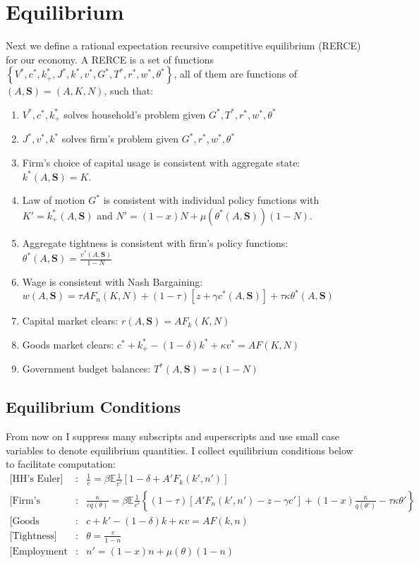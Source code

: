 \documentclass[12pt]{article}
\begin{document}
\section{Equilibrium}
Next we define a rational expectation recursive competitive equilibrium (RERCE) for our economy. A RERCE is a set of functions $\left\{ V^{*}, c^{*}, k_{+}^{*}, J^{*}, k^{*}, v^{*}, G^{*},T^{*},r^{*},w^{*},\theta^{*} \right\} $, all of them are functions of $(A,\mathbf{S})=(A,K,N)$, such that:
\begin{enumerate}
	\item $V^{*},c^{*},k_{+}^{*}$ solves household's problem given $G^{*},T^{*},r^{*},w^{*},\theta^{*}$
	\item $J^{*},v^{*},k^{*}$ solves firm's problem given $G^{*},r^{*},w^{*},\theta^{*}$
	\item Firm's choice of capital usage is consistent with aggregate state: $k^{*}(A,\mathbf{S})=K$.
	\item Law of motion $G^{*}$ is consistent with individual policy functions with $K'=k_{+}^{*}(A,\mathbf{S})$ and $N'=(1-x)N+\mu(\theta^{*}(A,\mathbf{S}))(1-N)$.
	\item Aggregate tightness is consistent with firm's policy functions: $\theta^{*}(A,\mathbf{S})=\frac{v^{*}(A,\mathbf{S})}{1-N}$
	\item Wage is consistent with Nash Bargaining: $w(A,\mathbf{S}) = \tau A F_{n}(K,N) + (1-\tau)\left[ z+\gamma c^{*}(A,\mathbf{S}) \right] + \tau \kappa \theta^{*}(A,\mathbf{S})$
	\item Capital market clears: $r(A,\mathbf{S})=AF_{k}(K,N)$
	\item Goods market clears: $c^{*}+k_{+}^{*}-(1-\delta)k^{*}+\kappa v^{*} = A F(K,N)$
	\item Government budget balances: $T^{*}(A,\mathbf{S})=z (1-N)$
\end{enumerate}

\subsection{Equilibrium Conditions}
From now on I suppress many subscripts and superscripts and use small case variables to denote equilibrium quantities. I collect equilibrium conditions below to facilitate computation:
\begin{eqnarray}
	\text{[HH's Euler]} & :& \frac{1}{c} =\beta \mathbb{E} \frac{1}{c'} \left[  1-\delta + A'F_{k}(k',n') \right] \label{eqn:HHEuler} \\
	\text{[Firm's Euler]} & :& \frac{\kappa}{c q(\theta)} = \beta \mathbb{E} \frac{1}{c'} \left\{  (1-\tau) \left[ A'F_{n}(k',n')-z-\gamma c' \right]+(1-x)\frac{\kappa}{q(\theta')} -\tau \kappa \theta' \right\} \label{eqn:firmEuler} \\
	\text{[Goods Market]} & :& c+k'-(1-\delta)k + \kappa v = AF(k,n) \label{eqn:resource} \\
	\text{[Tightness]} & :& \theta = \frac{v}{1-n} \label{eqn:tightness}\\
	\text{[Employment LOM]} & :& n' = (1-x)n+\mu(\theta)(1-n)
\end{eqnarray}
\end{document}
